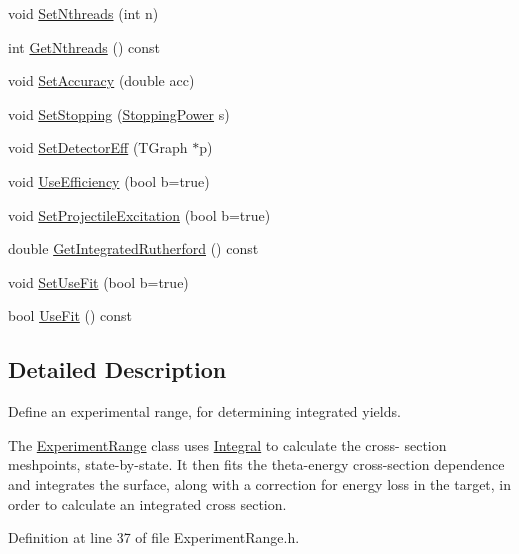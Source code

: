\begin{DoxyCompactItemize}
void \hyperlink{classExperimentRange_a098eebb45b8e1290e7c23107612392a1}{Set\-Nthreads} (int n)
\item 
int \hyperlink{classExperimentRange_a5a29b5bc1c4d8095899643fdb14ba552}{Get\-Nthreads} () const 
\item 
void \hyperlink{classExperimentRange_a0043948469f3eaa80e4c17783614941c}{Set\-Accuracy} (double acc)
\item 
void \hyperlink{classExperimentRange_a8df587a45ddeaa9855e72da17d660c74}{Set\-Stopping} (\hyperlink{classStoppingPower}{Stopping\-Power} s)
\item 
void \hyperlink{classExperimentRange_a22dab1b20aa39e59f3cd3e78bba506db}{Set\-Detector\-Eff} (T\-Graph $\ast$p)
\item 
void \hyperlink{classExperimentRange_a21457bd02435c4b113f3b5b7c474a5c2}{Use\-Efficiency} (bool b=true)
\item 
void \hyperlink{classExperimentRange_a8e6e4dde1e7316191fe4f3156bb03be3}{Set\-Projectile\-Excitation} (bool b=true)
\item 
double \hyperlink{classExperimentRange_a33b2e3936a2d5933397e82bdcd29d06c}{Get\-Integrated\-Rutherford} () const 
\item 
void \hyperlink{classExperimentRange_a90e7681ee2de091d7011d546922763d1}{Set\-Use\-Fit} (bool b=true)
\item 
bool \hyperlink{classExperimentRange_a3091c15329dd483ad78d1a14370c3111}{Use\-Fit} () const 
\end{DoxyCompactItemize}


\subsection{Detailed Description}
Define an experimental range, for determining integrated yields. 

The \hyperlink{classExperimentRange}{Experiment\-Range} class uses \hyperlink{classIntegral}{Integral} to calculate the cross-\/ section meshpoints, state-\/by-\/state. It then fits the theta-\/energy cross-\/section dependence and integrates the surface, along with a correction for energy loss in the target, in order to calculate an integrated cross section. 

Definition at line 37 of file Experiment\-Range.\-h.



